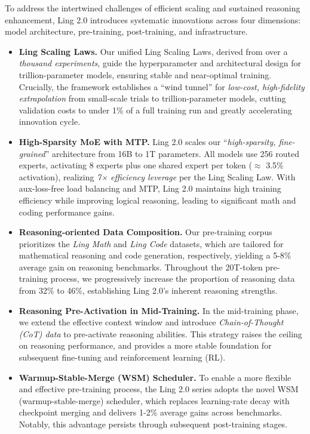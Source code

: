 To address the intertwined challenges of efficient scaling and sustained reasoning enhancement, Ling 2.0 introduces systematic innovations across four dimensions: model architecture, pre-training, post-training, and infrastructure.


\begin{itemize}
  \item \textbf{Ling Scaling Laws.} 
  Our unified Ling Scaling Laws, derived from over a \textit{thousand experiments}, guide the hyperparameter and architectural design for trillion-parameter models, ensuring stable and near-optimal training. Crucially, the framework establishes a ``wind tunnel'' for \textit{low-cost, high-fidelity extrapolation} from small-scale trials to trillion-parameter models, cutting validation costs to under 1\% of a full training run and greatly accelerating innovation cycle.
  
  \item \textbf{High-Sparsity MoE with MTP.} 
  Ling 2.0 scales our ``\textit{high-sparsity, fine-grained}'' architecture from 16B to 1T parameters. All models use 256 routed experts, activating 8 experts plus one shared expert per token ($\approx$ 3.5\% activation), realizing \textit{7× efficiency leverage} per the Ling Scaling Law. With aux-loss-free load balancing and MTP, Ling 2.0 maintains high training efficiency while improving logical reasoning, leading to significant math and coding performance gains.
  
\end{itemize}

\begin{itemize}
  \item \textbf{Reasoning-oriented Data Composition.} 
  Our pre-training corpus prioritizes the \textit{Ling Math} and \textit{Ling Code} datasets, which are tailored for mathematical reasoning and code generation, respectively, yielding a 5-8\% average gain on reasoning benchmarks. Throughout the 20T-token pre-training process, we progressively increase the proportion of reasoning data from 32\% to 46\%, establishing Ling 2.0's inherent reasoning strengths.
    
  \item \textbf{Reasoning Pre-Activation in Mid-Training.} 
  In the mid-training phase, we extend the effective context window and introduce \textit{Chain-of-Thought (CoT) data} to pre-activate reasoning abilities. This strategy raises the ceiling on reasoning performance, and provides a more stable foundation for subsequent fine-tuning and reinforcement learning (RL). 
  
  \item \textbf{Warmup-Stable-Merge (WSM) Scheduler.} 
  To enable a more flexible and effective pre-training process, the Ling 2.0 series adopts the novel WSM (warmup-stable-merge) scheduler, which replaces learning-rate decay with checkpoint merging and delivers 1-2\% average gains across benchmarks. Notably, this advantage persists through subsequent post-training stages. 
\end{itemize}

